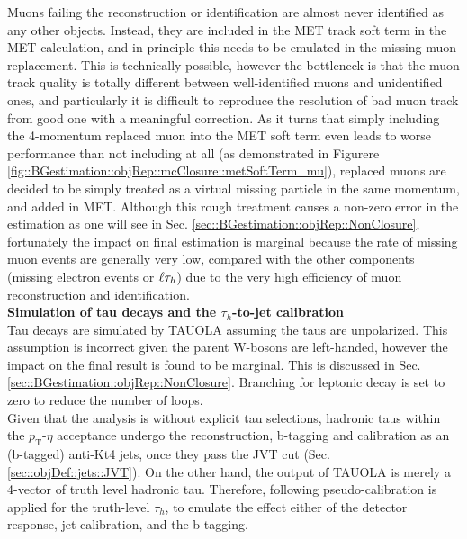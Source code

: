 Muons failing the reconstruction or identification are almost never identified as any other objects. Instead, they are included in the MET track soft term in the MET calculation, and in principle this needs to be emulated in the missing muon replacement. This is technically possible, however the bottleneck is that the muon track quality is totally different between well-identified muons and unidentified ones, and particularly it is difficult to reproduce the resolution of bad muon track from good one with a meaningful correction. As it turns that simply including the 4-momentum replaced muon into the MET soft term even leads to worse performance than not including at all (as demonstrated in Figurere \ref{fig::BGestimation::objRep::mcClosure::metSoftTerm_mu}), replaced muons are decided to be simply treated as a virtual missing particle in the same momentum, and added in MET.
Although this rough treatment causes a non-zero error in the estimation as one will see in Sec. \ref{sec::BGestimation::objRep::NonClosure}, fortunately the impact on final estimation is marginal because the rate of missing muon events are generally very low, compared with the other components (missing electron events or $\ell\tau_h$) due to the very high efficiency of muon reconstruction and identification. \\


\noindent \textbf{Simulation of tau decays and the $\tau_h$-to-jet calibration } \\
Tau decays are simulated by TAUOLA \cite{TAUOLA1} \cite{TAUOLA2} \cite{TAUOLA3} assuming the taus are unpolarized. This assumption is incorrect given the parent W-bosons are left-handed, however the impact on the final result is found to be marginal. This is discussed in Sec. \ref{sec::BGestimation::objRep::NonClosure}. Branching for leptonic decay is set to zero to reduce the number of loops. \\

Given that the analysis is without explicit tau selections, hadronic taus within the $p_{\mathrm{T}}$-$\eta$ acceptance undergo the reconstruction, b-tagging and calibration as an (b-tagged) anti-Kt4 jets, once they pass the JVT cut (Sec. \ref{sec::objDef::jets::JVT}). On the other hand, the output of TAUOLA is merely a 4-vector of truth level hadronic tau. Therefore, following pseudo-calibration is applied for the truth-level $\tau_h$, to emulate the effect either of the detector response, jet calibration, and the b-tagging.\\

